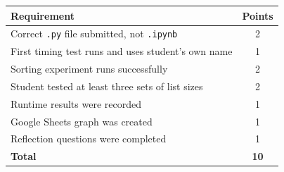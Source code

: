 \documentclass[11pt]{article}
\begin{document}
\begin{center}
\begin{tabular}{|>{\raggedright}p{4.3in}|c|}
\hline
\textbf{Requirement} & \textbf{Points} \\
\hline
Correct \texttt{.py} file submitted, not \texttt{.ipynb} & 2 \\
\hline
First timing test runs and uses student's own name & 1 \\
\hline
Sorting experiment runs successfully & 2 \\
\hline
Student tested at least three sets of list sizes & 2 \\
\hline
Runtime results were recorded & 1 \\
\hline
Google Sheets graph was created & 1 \\
\hline
Reflection questions were completed & 1 \\
\hline
\textbf{Total} & \textbf{10} \\
\hline
\end{tabular}
\end{center}
\end{document}
